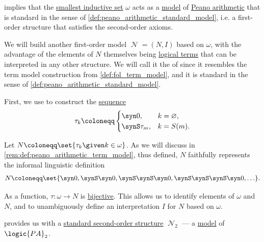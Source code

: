 \begin{definition}\label{def:peano_arithmetic_term_model}\mimprovised
   implies that the \hyperref[def:smallest_inductive_set]{smallest inductive set} \( \omega \) acts as a \hyperref[def:fol_semantics/model]{model} of \hyperref[def:peano_arithmetic]{Peano arithmetic} that is standard in the sense of \cref{def:peano_arithmetic_standard_model}, i.e. a first-order structure that satisfies the second-order axioms.

  We will build another first-order model \( \mscrN = (N, I) \) based on \( \omega \), with the advantage of the elements of \( N \) themselves being \hyperref[def:fol_term]{logical terms} that can be interpreted in any other structure. We will call it the  of  since it resembles the term model construction from \cref{def:fol_term_model}, and it is standard in the sense of \cref{def:peano_arithmetic_standard_model}.

  First, we use  to construct the \hyperref[def:sequence]{sequence}
  \begin{equation*}
    \tau_k \coloneqq \begin{cases}
      \syn0,        &k = \varnothing, \\
      \synS \tau_m, &k = S(m).
    \end{cases}
  \end{equation*}

  Let \( N \coloneqq \set{ \tau_k \given k \in \omega } \). As we will discuss in \cref{rem:def:peano_arithmetic_term_model}, thus defined, \( N \) faithfully represents the informal linguistic definition
  \begin{equation*}
    N \coloneqq \set{ \syn0, \synS \syn0, \synS \synS \syn0, \synS \synS \synS \syn0, \ldots }.
  \end{equation*}

  As a function, \( \tau: \omega \to N \) is \hyperref[def:function_invertibility/bijective]{bijective}. This allows us to identify elements of \( \omega \) and \( N \), and to unambiguously define an interpretation \( I \) for \( N \) based on \( \omega \).

   provides us with a \hyperref[def:hol_structure]{standard second-order structure} \( \mscrN_2 \) --- a \hyperref[def:hol_semantics/model]{model} of \( \logic{PA}_2 \).
\end{definition}
